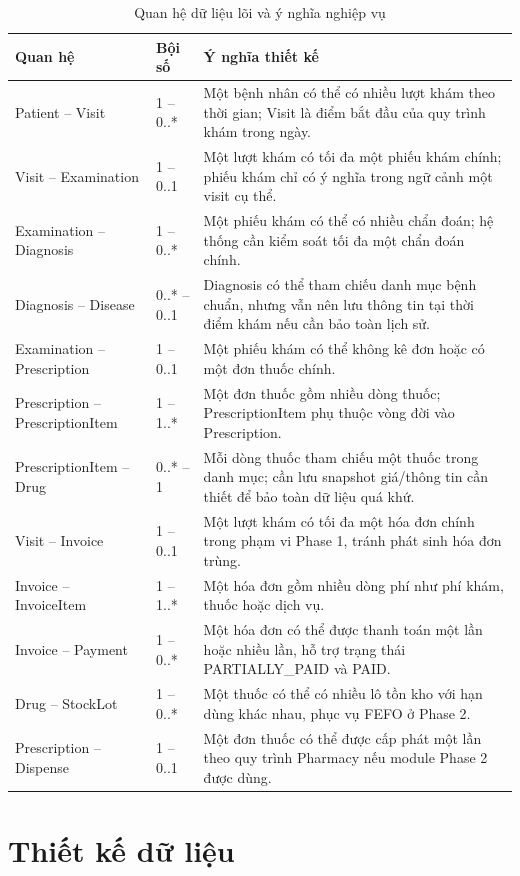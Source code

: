 \begin{longtable}{|p{4.2cm}|p{3cm}|p{7cm}|}
\caption{Quan hệ dữ liệu lõi và ý nghĩa nghiệp vụ}\\
\hline
\textbf{Quan hệ} & \textbf{Bội số} & \textbf{Ý nghĩa thiết kế} \\
\hline
Patient -- Visit & 1 -- 0..* & Một bệnh nhân có thể có nhiều lượt khám theo thời gian; Visit là điểm bắt đầu của quy trình khám trong ngày. \\
\hline
Visit -- Examination & 1 -- 0..1 & Một lượt khám có tối đa một phiếu khám chính; phiếu khám chỉ có ý nghĩa trong ngữ cảnh một visit cụ thể. \\
\hline
Examination -- Diagnosis & 1 -- 0..* & Một phiếu khám có thể có nhiều chẩn đoán; hệ thống cần kiểm soát tối đa một chẩn đoán chính. \\
\hline
Diagnosis -- Disease & 0..* -- 0..1 & Diagnosis có thể tham chiếu danh mục bệnh chuẩn, nhưng vẫn nên lưu thông tin tại thời điểm khám nếu cần bảo toàn lịch sử. \\
\hline
Examination -- Prescription & 1 -- 0..1 & Một phiếu khám có thể không kê đơn hoặc có một đơn thuốc chính. \\
\hline
Prescription -- PrescriptionItem & 1 -- 1..* & Một đơn thuốc gồm nhiều dòng thuốc; PrescriptionItem phụ thuộc vòng đời vào Prescription. \\
\hline
PrescriptionItem -- Drug & 0..* -- 1 & Mỗi dòng thuốc tham chiếu một thuốc trong danh mục; cần lưu snapshot giá/thông tin cần thiết để bảo toàn dữ liệu quá khứ. \\
\hline
Visit -- Invoice & 1 -- 0..1 & Một lượt khám có tối đa một hóa đơn chính trong phạm vi Phase 1, tránh phát sinh hóa đơn trùng. \\
\hline
Invoice -- InvoiceItem & 1 -- 1..* & Một hóa đơn gồm nhiều dòng phí như phí khám, thuốc hoặc dịch vụ. \\
\hline
Invoice -- Payment & 1 -- 0..* & Một hóa đơn có thể được thanh toán một lần hoặc nhiều lần, hỗ trợ trạng thái PARTIALLY\_PAID và PAID. \\
\hline
Drug -- StockLot & 1 -- 0..* & Một thuốc có thể có nhiều lô tồn kho với hạn dùng khác nhau, phục vụ FEFO ở Phase 2. \\
\hline
Prescription -- Dispense & 1 -- 0..1 & Một đơn thuốc có thể được cấp phát một lần theo quy trình Pharmacy nếu module Phase 2 được dùng. \\
\hline
\end{longtable}


\section{Thiết kế dữ liệu}

